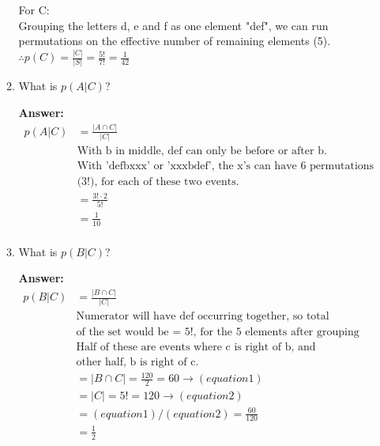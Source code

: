 \documentclass[14pt]{extreport}
\newcommand{\answer}[0]{\medskip \textbf{Answer:} \medskip}
\newcommand{\intersect}[0]{\cap}
\begin{document}
\begin{enumerate}[label=(\alph*)]
\begin{enumerate}
                For C: \\
                Grouping the letters d, e and f as one element "def", we can run permutations on the effective number of remaining elements (5). \\
                $\therefore p(C) = \frac{|C|}{|S|} = \frac{5!}{7!} = \frac{1}{42}$\\
                
                \item What is $p(A|C)$?
                
                \answer \\
                \begin{align*}
                    p(A|C)  &=  \frac{|A \intersect C|}{|C|}\\
                            &   \text{With b in middle, def can only be before or after b.} \\
                            &   \text{With 'defbxxx' or 'xxxbdef', the x's can have 6 permutations}\\
                            &   \text{(3!), for each of these two events.}\\
                            &=  \frac{3!\cdot2}{5!}\\
                            &=  \frac{1}{10}\\
                \end{align*}
                
                \item What is $p(B|C)$?
                
                \answer \\
                \begin{align*}
                    p(B|C)  &=  \frac{|B \intersect C|}{|C|}\\
                            &   \text{Numerator will have def occurring together, so total permutations} \\
                            &   \text{of the set would be = 5!, for the 5 elements after grouping def}\\
                            &   \text{Half of these are events where c is right of b, and} \\
                            &   \text{other half, b is right of c.}\\
                            &=  |B \intersect C| = \frac{120}{2} = 60 \rightarrow (equation1)\\
                            &=  |C| = 5! = 120 \rightarrow (equation2)\\
                            &=  (equation1)/(equation2) = \frac{60}{120}\\
                            &=  \frac{1}{2}\\
                \end{align*}
    

\end{enumerate}
\end{enumerate}
\end{document}
